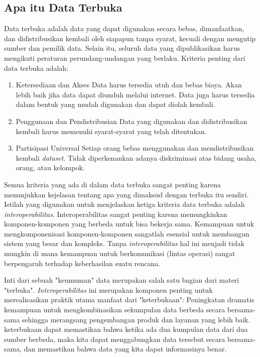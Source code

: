 \subsection{Apa itu Data Terbuka}
\label{sec: Apa itu Data Terbuka}
Data terbuka adalah data yang dapat digunakan secara bebas, dimanfaatkan, dan didistribusikan kembali oleh siapapun tanpa syarat, kecuali dengan mengutip sumber dan pemilik data. Selain itu, seluruh data yang dipublikasikan harus mengikuti peraturan perundang-undangan yang berlaku. Kriteria penting dari data terbuka adalah:
\begin{enumerate}
\item Ketersediaan dan Akses
Data harus tersedia utuh dan bebas biaya. Akan lebih baik jika data dapat diunduh melalui internet. Data juga harus tersedia dalam bentuk yang mudah digunakan dan dapat diolah kembali.
\item Penggunaan dan Pendistribusian 
Data yang digunakan dan didistribusikan kembali harus memenuhi syarat-syarat yang telah ditentukan.
\item Partisipasi Universal
Setiap orang bebas menggunakan dan mendistribusikan kembali \textit{dataset}. Tidak diperkenankan adanya diskriminasi atas bidang usaha, orang, atau kelompok.
\end{enumerate}

Semua kriteria yang ada di dalam data terbuka sangat penting karena menunjukkan kejelasan tentang apa yang dimaksud dengan terbuka itu sendiri. Istilah yang digunakan untuk menjelaskan ketiga kriteria data terbuka adalah \textit{interoperabilitas}. Interoperabilitas sangat penting karena memungkinkan komponen-komponen yang berbeda untuk bisa bekerja sama. Kemampuan untuk mengkomponenisasi komponen-komponen sangatlah esensial untuk membangun sistem yang besar dan kompleks. Tanpa \textit{interoperabilitas} hal ini menjadi tidak mungkin di mana kemampuan untuk berkomunikasi (lintas operasi) sangat berpengaruh terhadap keberhasilan suatu rencana.

Inti dari sebuah "keumuman" data merupakan salah satu bagian dari materi "terbuka". \textit{Interoperabilitas} ini merupakan komponen penting untuk merealisasikan praktik utama manfaat dari "keterbukaan": Peningkatan dramatis kemampuan untuk mengkombinasikan sekumpulan data berbeda secara bersama-sama sehingga merangsang pengembangan produk dan layanan yang lebih baik. keterbukaan dapat memastikan bahwa ketika ada dua kumpulan data dari dua sumber berbeda, maka kita dapat menggabungkan data tersebut secara bersama-sama, dan memastikan bahwa data yang kita dapat informasinya benar.


